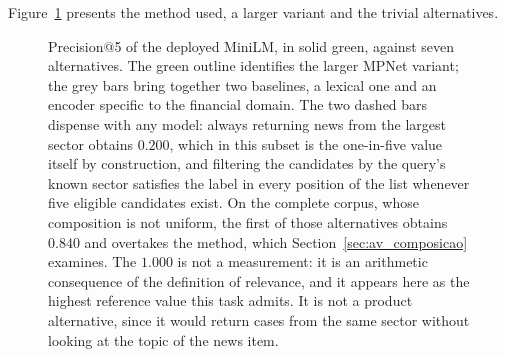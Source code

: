 Figure~\ref{fig:av_recuperacao} presents the method used, a larger variant and the trivial
alternatives.

\begin{figure}[htbp]
\centering
{}
\caption[Retrieval: the method against seven alternatives]{Precision@5 of the deployed MiniLM, in
solid green, against seven alternatives. The green outline identifies the larger MPNet variant; the
grey bars bring together two baselines, a lexical one and an encoder specific to the financial
domain. The two dashed bars dispense with any model: always returning news from the largest sector
obtains $0.200$, which in this subset is the one-in-five value itself by construction, and
filtering the candidates by the query's known sector satisfies the label in every
position of the list whenever five eligible candidates exist. On the complete corpus, whose
composition is not uniform, the first of those alternatives obtains $0.840$ and overtakes the
method, which Section~\ref{sec:av_composicao} examines. The $1.000$ is not a measurement: it
is an arithmetic consequence of the definition of relevance, and it appears here as the highest
reference value this task admits. It is not a product alternative, since it would return cases from
the same sector without looking at the topic of the news item.}
\label{fig:av_recuperacao}
\end{figure}

